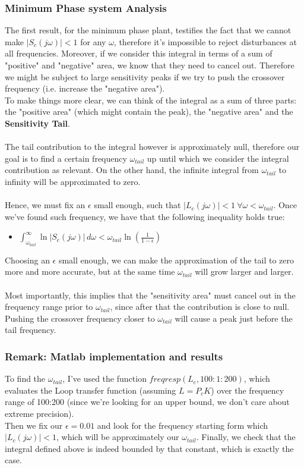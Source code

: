 \documentclass[a4paper, 12pt]{article}
\begin{document}
\subsubsection{Minimum Phase system Analysis}
The first result, for the minimum phase plant, testifies the fact that we cannot make $|S_c(j\omega)|<1$ for any $\omega$, therefore it's impossible to reject disturbances at all frequencies. Moreover, if we consider this integral in terms of a sum of "positive" and "negative" area, we know that they need to cancel out. Therefore we might be subject to large sensitivity peaks if we try to push the crossover frequency (i.e. increase the "negative area").
\\
To make things more clear, we can think of the integral as a sum of three parts: the "positive area" (which might contain the peak), the "negative area" and the \textbf{Sensitivity Tail}. \\
\\ The tail contribution to the integral however is approximately null, therefore our goal is to find a certain frequency $\omega_{tail}$ up until which we consider the integral contribution as relevant. On the other hand, the infinite integral from $\omega_{tail}$ to infinity will be approximated to zero. 
\\\\
Hence, we must fix an $\epsilon$ small enough, such that $|L_c(j\omega)| < 1\ \forall \omega < \omega_{tail}$. Once we've found such frequency, we have that the following inequality holds true:
\begin{itemize}
    \item$\int_{\omega_{tail}}^{\infty} \ln \left| S_c(j\omega) \right| \, d\omega < \omega_{tail} \ln(\frac{1}{1-\epsilon})$
\end{itemize}
Choosing an $\epsilon$ small enough, we can make the approximation of the tail to zero more and more accurate, but at the same time $\omega_{tail}$ will grow larger and larger.
\\\\
Most importantly, this implies that the "sensitivity area" must cancel out in the frequency range prior to $\omega_{tail}$, since after that the contribution is close to null. Pushing the crossover frequency closer to $\omega_{tail}$ will cause a peak just before the tail frequency.

\subsubsection*{Remark: Matlab implementation and results}
To find the $\omega_{tail}$, I've used the function $freqresp(L_c,100:1:200)$, which evaluates the Loop transfer function (assuming $L = P_cK$) over the frequency range of 100:200 (since we're looking for an upper bound, we don't care about extreme precision).   
\\Then we fix our $\epsilon = 0.01$ and look for the frequency starting form which $|L_c(j\omega)| < 1$, which will be approximately our $\omega_{tail}$. Finally, we check that the integral defined above is indeed bounded by that constant, which is exactly the case.
\\
\end{document}

